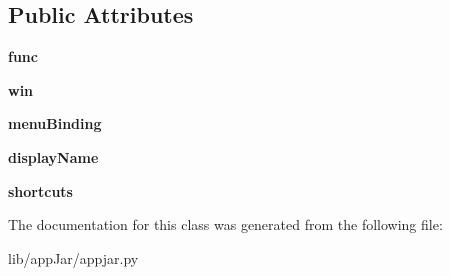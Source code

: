 \subsection*{Public Attributes}
\begin{DoxyCompactItemize}
\item 
\mbox{\label{classappjar_1_1_event_binding_a0458bf81b243874dbe88172ebe0a6e82}} 
{\bfseries func}
\item 
\mbox{\label{classappjar_1_1_event_binding_afde83874c2cef07fa9505457ba4d6ea0}} 
{\bfseries win}
\item 
\mbox{\label{classappjar_1_1_event_binding_ab5aa7594009c513da84cf85815b142bf}} 
{\bfseries menu\+Binding}
\item 
\mbox{\label{classappjar_1_1_event_binding_aa46f3e2b3c0bfc313ea1a3decfd4e42b}} 
{\bfseries display\+Name}
\item 
\mbox{\label{classappjar_1_1_event_binding_a07b030568763468a9ca1c0ebe84977ee}} 
{\bfseries shortcuts}
\end{DoxyCompactItemize}


The documentation for this class was generated from the following file\+:\begin{DoxyCompactItemize}
\item 
lib/app\+Jar/appjar.\+py\end{DoxyCompactItemize}
